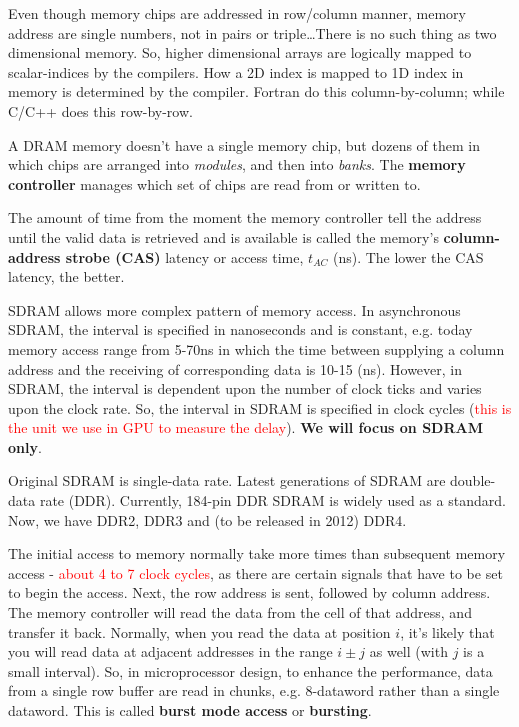 \begin{framed}
  Even though memory chips are addressed in row/column manner, memory
  address are single numbers, not in pairs or triple\ldots There is no such
  thing as two dimensional memory. So, higher dimensional arrays are logically
  mapped to scalar-indices by the compilers. How a 2D index is mapped to 1D
  index in memory is determined by the compiler. Fortran do
  this column-by-column; while C/C++ does this row-by-row.
\end{framed}

A DRAM memory doesn't have a single memory chip, but dozens of them in which
chips are arranged into {\it modules}, and then into {\it banks}. The
{\bf memory controller} manages which set of chips are read from or
written to. 



The amount of time from the moment the memory controller
tell the address until the valid data is retrieved and is available is
called the memory's {\bf column-address strobe (CAS)} latency or
access time, $t_{AC}$ (ns). The lower the CAS latency, the better.

SDRAM allows more complex pattern of memory access.  In
asynchronous SDRAM, the interval is specified in nanoseconds and is
constant, e.g.  today memory access range from 5-70ns in which the
time between supplying a column address and the receiving of
corresponding data is 10-15 (ns).  However, in SDRAM, the interval is
dependent upon the number of clock ticks and varies upon the clock
rate. So, the interval in SDRAM is specified in clock cycles
(\textcolor{red}{this is the unit we use in GPU to measure the
  delay}). {\bf We will focus on SDRAM only}.

\begin{framed}
  Original SDRAM is single-data rate. Latest generations of SDRAM are
  double-data rate (DDR). Currently, 184-pin DDR SDRAM is widely used
  as a standard. Now, we have DDR2, DDR3 and (to be released in 2012)
  DDR4.
\end{framed}

The initial access to memory normally take more times than subsequent
memory access - \textcolor{red}{about 4 to 7 clock cycles}, as there
are certain signals that have to be set to begin the access. Next, the
row address is sent, followed by column address. The memory controller
will read the data from the cell of that address, and transfer it
back.  Normally, when you read the data at position $i$, it's likely
that you will read data at adjacent addresses in the range $i\pm j$ as
well (with $j$ is a small interval). So, in microprocessor design, to
enhance the performance, data from a single row buffer are read in
chunks, e.g. 8-dataword rather than a single dataword. This is called
{\bf burst mode access} or {\bf bursting}.

